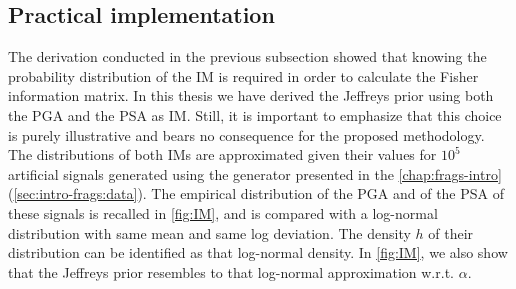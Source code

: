     \subsection{Practical implementation}\label{sec:PREM:subsec-jeffprectical}



    The derivation conducted in the previous subsection showed that knowing the probability distribution of the IM is required in order to calculate the Fisher information matrix. %
    In this thesis we have derived the Jeffreys prior using both the PGA and the PSA as IM.
    {Still, it is important to emphasize that this choice is purely illustrative and bears no consequence for the proposed methodology.} 
    The distributions of both IMs are approximated given their values for $10^5$ artificial signals generated using the generator presented in the \cref{chap:frags-intro} (\cref{sec:intro-frags:data}).
    The empirical distribution of the PGA and of the PSA of these signals is recalled in \cref{fig:IM}, and is compared with a log-normal distribution with same mean and same log deviation. 
    The density $h$ of their distribution can be identified as that log-normal density. 
    In \cref{fig:IM}, we also show that the Jeffreys prior resembles to that log-normal approximation w.r.t. $\alpha$.


